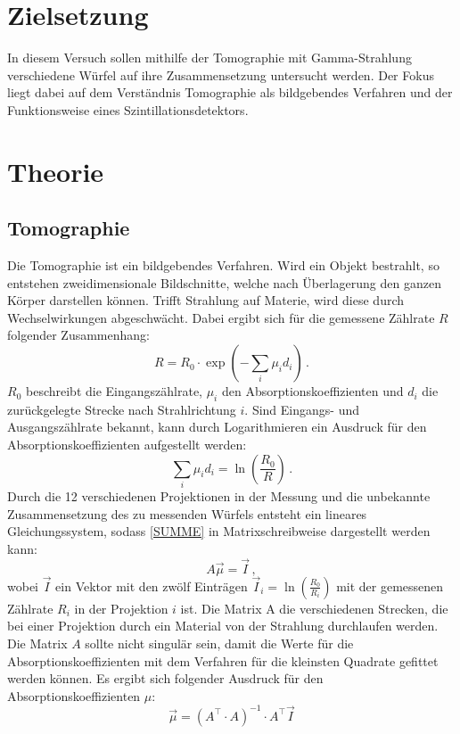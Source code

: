 \section{Zielsetzung}
In diesem Versuch sollen mithilfe der Tomographie mit Gamma-Strahlung verschiedene Würfel auf ihre Zusammensetzung untersucht werden.
Der Fokus liegt dabei auf dem Verständnis Tomographie als bildgebendes Verfahren und der Funktionsweise eines Szintillationsdetektors.

\section{Theorie}
\label{sec:Theorie}

\subsection{Tomographie}
Die Tomographie ist ein bildgebendes Verfahren.
Wird ein Objekt bestrahlt, so entstehen zweidimensionale Bildschnitte, welche nach Überlagerung den ganzen Körper darstellen können.
Trifft Strahlung auf Materie, wird diese durch Wechselwirkungen abgeschwächt.
Dabei ergibt sich für die gemessene Zählrate $R$ folgender Zusammenhang:
\begin{equation}
    R = R_0 \cdot \exp{(- \sum_{i} \mu_i d_i)} \, .
\end{equation}
$R_0$ beschreibt die Eingangszählrate, $\mu_i$ den Absorptionskoeffizienten und $d_i$ die zurückgelegte Strecke nach Strahlrichtung $i$.
Sind Eingangs- und Ausgangszählrate bekannt, kann durch Logarithmieren ein Ausdruck für den Absorptionskoeffizienten aufgestellt werden:
\begin{equation}
    \sum_{i} \mu_i d_i = \ln\left(\frac{R_0}{R}\right) \, .
    \label{eqn:SUMME}
\end{equation}
Durch die 12 verschiedenen Projektionen in der Messung und die unbekannte Zusammensetzung des zu messenden Würfels 
entsteht ein lineares Gleichungssystem, sodass \eqref{SUMME} in Matrixschreibweise dargestellt werden kann:
\begin{equation}
    A \vec{\mu} = \vec{I} \, ,
    \label{eqn:matrix}
\end{equation}
wobei $\vec{I}$ ein Vektor mit den zwölf Einträgen $\vec{I}_i = \ln\left(\frac{R_0}{R_i}\right)$ mit der gemessenen Zählrate $R_i$ in der Projektion $i$ ist.
Die Matrix A die verschiedenen Strecken, die bei einer Projektion durch ein Material von der Strahlung durchlaufen werden.
Die Matrix $A$ sollte nicht singulär sein, damit die Werte für die Absorptionskoeffizienten mit dem Verfahren für die kleinsten Quadrate gefittet werden können.
Es ergibt sich folgender Ausdruck für den Absorptionskoeffizienten $\mu$:
\begin{equation*}
    \vec{\mu} = \left( A^\top \cdot A \right)^{-1} \cdot A^\top \vec{I}
\end{equation*}

